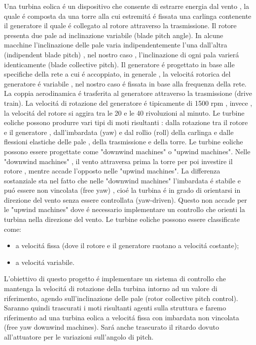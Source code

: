 \documentclass[a4paper,13pt]{article}
\begin{document}
Una turbina eolica \'e un dispositivo che consente di estrarre energia dal vento , la quale \'e composta da una torre alla cui estremit\'a \'e fissata una carlinga contenente il generatore il quale \'e collegato al rotore attraverso la trasmissione.
Il rotore presenta due pale ad inclinazione variabile (blade pitch angle).
In alcune macchine l'inclinazione delle pale varia indipendentemente l'una dall'altra (indipendent blade pitch) , nel nostro caso , l'inclinazione di ogni pala varier\'a identicamente (blade collective pitch).
Il generatore \'e progettato in base alle specifiche della rete a cui \'e accoppiato, in generale , la velocit\'a rotorica del generatore \'e variabile , nel nostro caso \'e fissata in base alla frequenza della rete.
La coppia aerodinamica \'e trasferita al generatore attraverso la trasmissione (drive train).
La velocit\'a di rotazione del generatore \'e tipicamente di 1500 rpm , invece , la velocit\'a del rotore si aggira tra le 20 e le 40 rivoluzioni al minuto.
Le turbine eoliche possono produrre vari tipi di moti risultanti : dalla rotazione tra il rotore e il generatore , dall'imbardata (yaw) e dal rollio (roll) della carlinga e dalle flessioni elastiche delle pale , della trasmissione e della torre.
Le turbine eoliche possono essere progettate come "downwind machines" o "upwind machines".
Nelle "downwind machines" , il vento attraversa prima la torre per poi investire il rotore , mentre accade l'opposto nelle "upwind machines".
La differenza sostanziale sta nel fatto che nelle "downwind machines" l'imbardata \'e stabile e pu\'o essere non vincolata (free yaw) , cio\'e la turbina \'e in grado di orientarsi in direzione del vento senza essere controllata (yaw-driven).
Questo non accade per le "upwind machines" dove \'e necessario implementare un controllo che orienti la turbina nella direzione del vento.
Le turbine eoliche possono essere classificate come:
\begin{itemize}
\item a velocit\'a fissa (dove il rotore e il generatore ruotano a velocit\'a costante);
\item a velocit\'a variabile.
\end{itemize}
L'obiettivo di questo progetto \'e implementare un sistema di controllo che mantenga la velocit\'a di rotazione della turbina intorno ad un valore di riferimento, agendo sull'inclinazione delle pale (rotor collective pitch control).
Saranno quindi trascurati i moti risultanti agenti sulla struttura e faremo riferimento ad una turbina eolica a velocit\'a fissa con imbardata non vincolata (free yaw downwind machines).
Sar\'a anche trascurato il ritardo dovuto all'attuatore per le variazioni sull'angolo di pitch.
\end{document}
